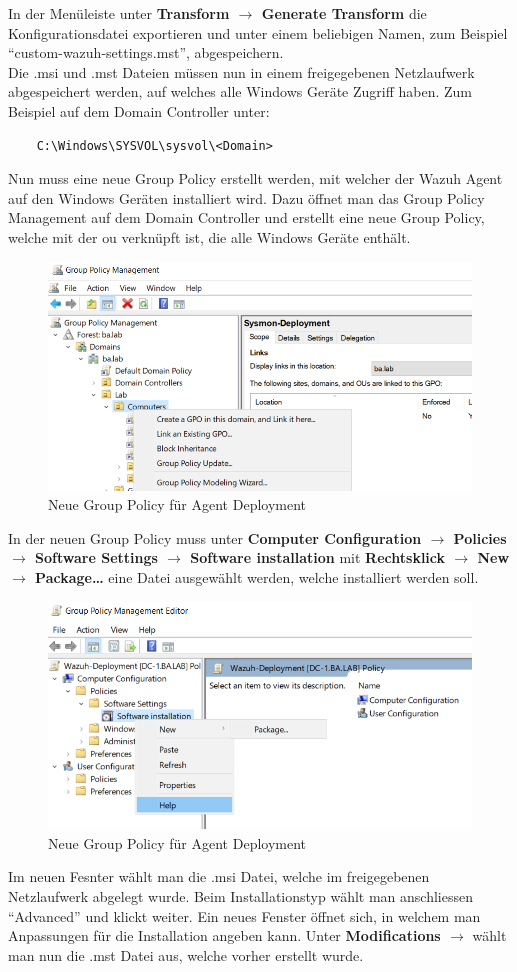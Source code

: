 In der Menüleiste unter \textbf{Transform $\rightarrow$ Generate Transform} die Konfigurationsdatei exportieren und unter einem beliebigen Namen, zum Beispiel ``custom-wazuh-settings.mst'', abgespeichern.\\

Die .msi und .mst Dateien müssen nun in einem freigegebenen Netzlaufwerk abgespeichert werden, auf welches alle Windows Geräte Zugriff haben. Zum Beispiel auf dem Domain Controller unter:
\begin{lstlisting}
    C:\Windows\SYSVOL\sysvol\<Domain>
\end{lstlisting}

Nun muss eine neue Group Policy erstellt werden, mit welcher der Wazuh Agent auf den Windows Geräten installiert wird.
Dazu öffnet man das Group Policy Management auf dem Domain Controller und erstellt eine neue Group Policy, welche mit der \acrshort{ou} verknüpft ist, die alle Windows Geräte enthält.
\begin{figure}[H]
    \centering
    \includegraphics[width=0.7\linewidth]{../img/agent/create-new-group-policy.png}
    \caption{Neue Group Policy für Agent Deployment}
\end{figure}

In der neuen Group Policy muss unter \textbf{Computer Configuration $\rightarrow$ Policies $\rightarrow$ Software Settings $\rightarrow$ Software installation} mit \textbf{Rechtsklick $\rightarrow$ New $\rightarrow$ Package\dots} eine Datei ausgewählt werden, welche installiert werden soll.

\begin{figure}[H]
    \centering
    \includegraphics[width=0.7\linewidth]{../img/agent/new-software-install.png}
    \caption{Neue Group Policy für Agent Deployment}
\end{figure}
Im neuen Fesnter wählt man die .msi Datei, welche im freigegebenen Netzlaufwerk abgelegt wurde.
Beim Installationstyp wählt man anschliessen ``Advanced'' und klickt weiter.
Ein neues Fenster öffnet sich, in welchem man Anpassungen für die Installation angeben kann.
Unter \textbf{Modifications $\rightarrow$} wählt man nun die .mst Datei aus, welche vorher erstellt wurde.\\

